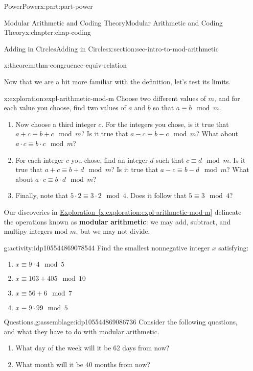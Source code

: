 \documentclass[oneside,10pt,]{book}
\newcommand{\xreffont}{\relax}
\newcommand{\terminology}[1]{\textbf{#1}}
\numberwithin{equation}{section}
\begin{document}
\begin{partptx}{Power}{}{Power}{}{}{x:part:part-power}
\begin{chapterptx}{Modular Arithmetic and Coding Theory}{}{Modular Arithmetic and Coding Theory}{}{}{x:chapter:chap-coding}
\begin{sectionptx}{Adding in Circles}{}{Adding in Circles}{}{}{x:section:sec-intro-to-mod-arithmetic}
\begin{theorem}{}{}{x:theorem:thm-congruence-equiv-relation}
\begin{itemize}[label=\textbullet]
\end{itemize}
\end{theorem}
Now that we are a bit more familiar with the definition, let's test its limits.%
\begin{exploration}{}{x:exploration:expl-arithmetic-mod-m}%
Choose two different values of \(m\), and for each value you choose, find two values of \(a\) and \(b\) so that \(a\equiv b\mod m\).%
%
\begin{enumerate}
\item{}Now choose a third integer \(c\). For the integers you chose, is it true that \(a+c \equiv b+c\mod m\)? Is it true that \(a-c \equiv b-c\mod m\)? What about \(a\cdot c\equiv b\cdot c\mod m\)?%
\item{}For each integer \(c\) you chose, find an integer \(d\) such that \(c\equiv d\mod m\). Is it true that \(a+c \equiv b+d\mod m\)? Is it true that \(a-c \equiv b-d\mod m\)? What about \(a\cdot c \equiv b\cdot d\mod m\)?%
\item{}Finally, note that \(5\cdot 2 \equiv 3\cdot 2\mod 4\). Does it follow that \(5\equiv 3\mod 4\)?%
\end{enumerate}
\end{exploration}%
Our discoveries in \hyperref[x:exploration:expl-arithmetic-mod-m]{Exploration~{\xreffont\ref{x:exploration:expl-arithmetic-mod-m}}} delineate the operations known as \terminology{modular arithmetic}: we may add, subtract, and multipy integers mod \(m\), but we may not divide.%
\begin{activity}{}{g:activity:idp105544869078544}%
Find the smallest nonnegative integer \(x\) satisfying:%
%
\begin{enumerate}
\item{}\(\displaystyle x\equiv 9\cdot 4\mod 5\)%
\item{}\(\displaystyle x\equiv 103+405\mod 10\)%
\item{}\(\displaystyle x \equiv 56 + 6\mod 7\)%
\item{}\(\displaystyle x \equiv 9\cdot 99\mod 5\)%
\end{enumerate}
\end{activity}%
\begin{assemblage}{Questions.}{g:assemblage:idp105544869086736}%
Consider the following questions, and what they have to do with modular arithmetic. %
\begin{enumerate}
\item{}What day of the week will it be 62 days from now?%
\item{}What month will it be 40 months from now?%

\end{enumerate}
\end{assemblage}
\end{sectionptx}
\end{chapterptx}
\end{partptx}
\end{document}
